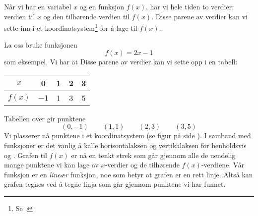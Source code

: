 \section{\lingraf}
Når vi har en variabel $ x $ og en funksjon $ f(x) $, har vi hele tiden to verdier; verdien til $ x $ og den tilhørende verdien til $ f(x) $. Disse parene av verdier kan vi sette inn i et koordinatsystem\footnote{Se .} for å lage  til $ f(x) $. \vsk

La oss bruke funksjonen 
\[ f(x)=2x-1 \]
som eksempel. Vi har at
Disse parene av verdier kan vi sette opp i en tabell:
	\begin{center}
	\begin{tabular}{c | c |c |c|c}
		$ x $ & 0 & 1 & 2 & 3 \\ \hline
		$ f(x) $ &$  -1 $ & 1&3 &5
	\end{tabular}
\end{center}
Tabellen over gir punktene
\[ (0, -1)\quad\quad(1, 1)\quad\quad(2, 3)\quad\quad(3, 5) \]
Vi plasserer nå punktene i et koordinatsystem (se figur på side \pageref{funkfig}). I samband med funksjoner er det vanlig å kalle horisontalaksen og vertikalaksen for henholdsvis  og . 
Grafen til $ f(x) $ er nå en tenkt strek som går gjennom alle de uendelig mange punktene vi kan lage av $ x$-verdier og de tilhørende $ f(x) $-verdiene. Vår funksjon er en \textit{lineær} funksjon, noe som betyr at grafen er en rett linje. Altså kan grafen tegnes ved å tegne linja som går gjennom punktene vi har funnet.\vsk

